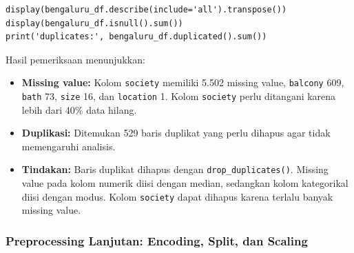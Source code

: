 \documentclass[a4paper,oneside,12pt]{report}
\begin{document}
\begin{lstlisting}[style=pythonstyle,caption={Pemeriksaan kualitas data Bengaluru.}]
display(bengaluru_df.describe(include='all').transpose())
display(bengaluru_df.isnull().sum())
print('duplicates:', bengaluru_df.duplicated().sum())
\end{lstlisting}

Hasil pemeriksaan menunjukkan:
\begin{itemize}
    \item \textbf{Missing value:} Kolom \texttt{society} memiliki 5.502 missing value, \texttt{balcony} 609, \texttt{bath} 73, \texttt{size} 16, dan \texttt{location} 1. Kolom \texttt{society} perlu ditangani karena lebih dari 40\% data hilang.
    \item \textbf{Duplikasi:} Ditemukan 529 baris duplikat yang perlu dihapus agar tidak memengaruhi analisis.
    \item \textbf{Tindakan:} Baris duplikat dihapus dengan \texttt{drop\_duplicates()}. Missing value pada kolom numerik diisi dengan median, sedangkan kolom kategorikal diisi dengan modus. Kolom \texttt{society} dapat dihapus karena terlalu banyak missing value.
\end{itemize}

\subsubsection{Preprocessing Lanjutan: Encoding, Split, dan Scaling}
\end{document}
